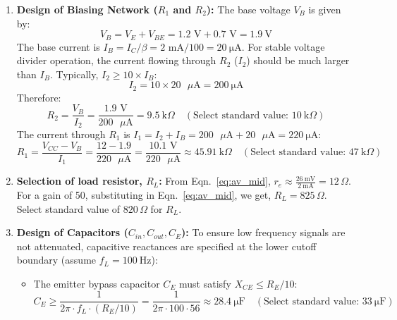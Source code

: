 \begin{enumerate}
	\item \textbf{Design of Biasing Network ($R_1$ and $R_2$):}
	The base voltage $V_B$ is given by:
	\begin{equation}
		V_B = V_E + V_{BE} = 1.2\text{ V} + 0.7\text{ V} = \SI{1.9}{\volt}
	\end{equation}
	The base current is $I_B = I_C / \beta = 2\text{ mA} / 100 = \SI{20}{\micro\ampere}$. For stable voltage divider operation, the current flowing through $R_2$ ($I_2$) should be much larger than $I_B$. Typically, $I_2 \ge 10 \times I_B$:
	\begin{equation}
		I_2 = 10 \times 20\text{ }\mu\text{A} = \SI{200}{\micro\ampere}
	\end{equation}
	Therefore:
	\begin{equation}
		R_2 = \frac{V_B}{I_2} = \frac{1.9\text{ V}}{200\text{ }\mu\text{A} } = \SI{9.5}{\kilo\Omega} \quad (\text{Select standard value: } \SI{10}{\kilo\Omega})
	\end{equation}
	The current through $R_1$ is $I_1 = I_2 + I_B = 200\text{ }\mu\text{A} + 20\text{ }\mu\text{A} = \SI{220}{\micro\ampere}$:
	\begin{equation}
		R_1 = \frac{V_{CC} - V_B}{I_1} = \frac{12 - 1.9}{220\text{ }\mu\text{A}} = \frac{10.1\text{ V}}{220\text{ }\mu\text{A}} \approx \SI{45.91}{\kilo\Omega} \quad (\text{Select standard value: } \SI{47}{\kilo\Omega})
	\end{equation}
	\item \textbf{Selection of load resistor, $R_L$:} From Eqn.~\ref{eq:av_mid},  $r_e\approx\frac{\SI{26}{\milli\volt}}{\SI{2}{\milli\ampere}}=12\,{\Omega}$. \\
	For a gain of 50, substituting in Eqn.~\ref{eq:av_mid}, we get, $R_L=825\,\Omega$.\\
	Select standard value of $820\, \Omega$ for $R_L$.
	\item \textbf{Design of Capacitors ($C_{in}, C_{out}, C_E$):}
	To ensure low frequency signals are not attenuated, capacitive reactances are specified at the lower cutoff boundary (assume $f_L = \SI{100}{\hertz}$):
	\begin{itemize}
		\item The emitter bypass capacitor $C_E$ must satisfy $X_{CE} \le R_E / 10$:
		\begin{equation}
			C_E \ge \frac{1}{2\pi \cdot f_L \cdot (R_E / 10)} = \frac{1}{2\pi \cdot 100 \cdot 56} \approx \SI{28.4}{\micro\farad} \quad (\text{Select standard value: } \SI{33}{\micro\farad})
		\end{equation}

\end{itemize}
\end{enumerate}

